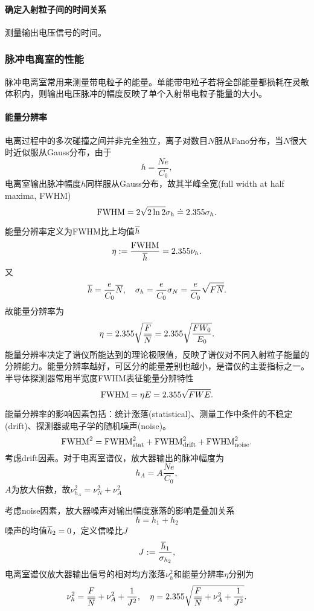 \paragraph{确定入射粒子间的时间关系}
测量输出电压信号的时间。
\subsubsection{脉冲电离室的性能}
脉冲电离室常用来测量带电粒子的能量。单能带电粒子若将全部能量都损耗在灵敏体积内，则输出电压脉冲的幅度反映了单个入射带电粒子能量的大小。
\paragraph{能量分辨率}
电离过程中的多次碰撞之间并非完全独立，离子对数目$N$服从Fano分布，当$N$很大时近似服从Gauss分布，由于
\[
	h=\frac{Ne}{C_0},
\]
电离室输出脉冲幅度$h$同样服从Gauss分布，故其半峰全宽(full width at half maxima, FWHM)
\[
	\mathrm{FWHM}=2\sqrt{2\ln2}\sigma_h\doteq 2.355\sigma_h.
\]

能量分辨率定义为FWHM比上均值$\overline h$
\[
	\eta:=\frac{\mathrm{FWHM}}{\overline h}=2.355\nu_h.
\]
又
\[
	\overline h=\frac e{C_0}\overline N,\quad\sigma_h=\frac e{C_0}\sigma_N=\frac e{C_0}\sqrt{F\overline N}.
\]
故能量分辨率为
\begin{align}
	\eta=2.355\sqrt{\frac{F}{\overline N}}=2.355\sqrt{\frac{FW_0}{E_0}}.
\end{align}
能量分辨率决定了谱仪所能达到的理论极限值，反映了谱仪对不同入射粒子能量的分辨能力。能量分辨率越好，可区分的能量差别也越小，是谱仪的主要指标之一。半导体探测器常用半宽度FWHM表征能量分辨特性
\[
	\mathrm{FWHM}=\eta E=2.355\sqrt{FWE}.
\]

能量分辨率的影响因素包括：统计涨落(statistical)、测量工作中条件的不稳定(drift)、探测器或电子学的随机噪声(noise)。
\[
	\mathrm{FWHM}^2=\mathrm{FWHM}_{\mathrm{stat}}^2+\mathrm{FWHM}_{\mathrm{drift}}^2+\mathrm{FWHM}_{\mathrm{noise}}^2.
\]
考虑drift因素。对于电离室谱仪，放大器输出的脉冲幅度为
\[
	h_A=A\frac{Ne}{C_0},
\]
$A$为放大倍数，故$\nu_{h_A}^2=\nu_N^2+\nu_A^2$

考虑noise因素，放大器噪声对输出幅度涨落的影响是叠加关系
\[
	h=h_1+h_2
\]
噪声的均值$\overline h_2=0$，定义信噪比$J$
\[
	J:=\frac{\overline h_1}{\sigma_{h_2}},
\]
电离室谱仪放大器输出信号的相对均方涨落$\nu_h^2$和能量分辨率$\eta$分别为
\[
	\nu_h^2=\frac F{\overline N}+\nu_A^2+\frac1{J^2},\quad \eta=2.355\sqrt{\frac F{\overline N}+\nu_A^2+\frac1{J^2}}.
\]
